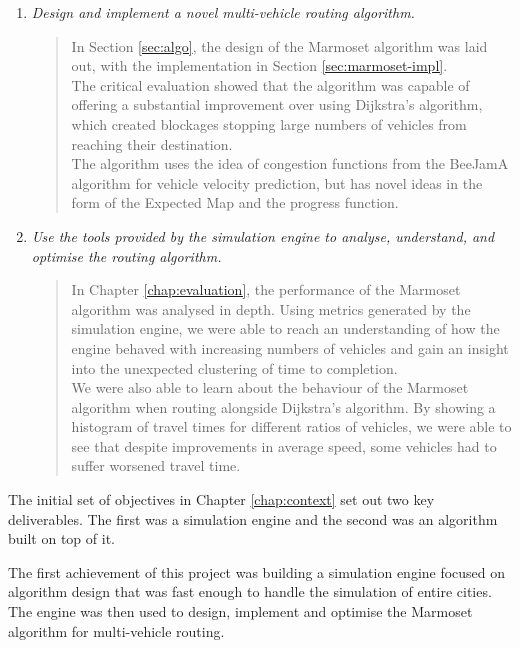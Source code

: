 \documentclass[ %
                    author={Alexander Hill},
                supervisor={Dr. Benjamin Sach},
                    degree={MEng},
                     title={MARMOSET},
                  subtitle={Multi-Agent Route Management using Online Simulation for Efficient Transportation},
                      type={research},
                      year={2016} ]{dissertation}
\begin{document}
\begin{enumerate}
    \item \textit{Design and implement a novel multi-vehicle routing algorithm.}
    \begin{quote}
        In Section \ref{sec:algo}, the design of the Marmoset algorithm was laid
        out, with the implementation in Section \ref{sec:marmoset-impl}. \\

        The critical evaluation showed that the algorithm was capable of
        offering a substantial improvement over using Dijkstra's algorithm,
        which created blockages stopping large numbers of vehicles from reaching
        their destination. \\

        The algorithm uses the idea of congestion functions from the BeeJamA
        algorithm for vehicle velocity prediction, but has novel ideas in the
        form of the Expected Map and the progress function.
    \end{quote}

    \item \textit{Use the tools provided by the simulation engine to analyse,
        understand, and optimise the routing algorithm.}
    \begin{quote}
        In Chapter \ref{chap:evaluation}, the performance of the Marmoset
        algorithm was analysed in depth. Using metrics generated by the
        simulation engine, we were able to reach an understanding of how the
        engine behaved with increasing numbers of vehicles and gain an insight
        into the unexpected clustering of time to completion. \\

        We were also able to learn about the behaviour of the Marmoset algorithm
        when routing alongside Dijkstra's algorithm. By showing a histogram of
        travel times for different ratios of vehicles, we were able to see that despite
        improvements in average speed, some vehicles had to suffer worsened
        travel time.
    \end{quote}

\end{enumerate}

The initial set of objectives in Chapter \ref{chap:context} set out two key
deliverables. The first was a simulation engine and the second was an algorithm
built on top of it.

The first achievement of this project was building a simulation engine focused
on algorithm design that was fast enough to handle the simulation of entire
cities.  The engine was then used to design, implement and optimise the Marmoset
algorithm for multi-vehicle routing.
\end{document}
